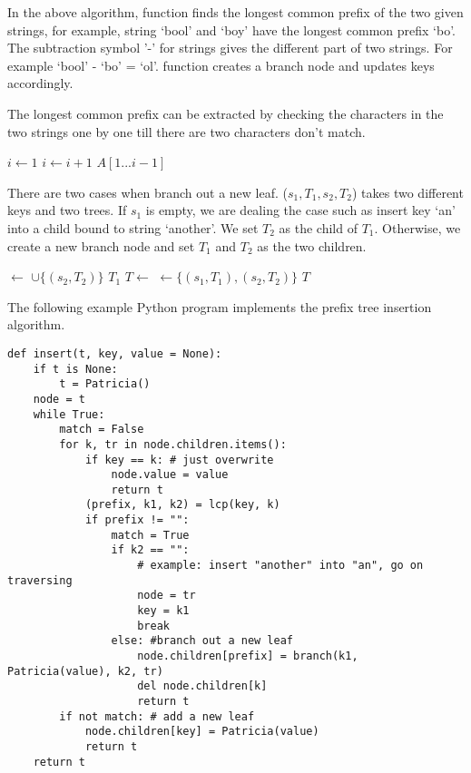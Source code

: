 \documentclass{article}
\begin{document}
In the above algorithm,  function finds the longest
common prefix of the two given strings, for example, string `bool' and `boy'
have the longest common prefix `bo'. The subtraction symbol '-' for
strings gives the different part of two strings. For example `bool' - `bo' = `ol'.  function creates a branch node
and updates keys accordingly.

The longest common prefix can be extracted by checking the characters in the two
strings one by one till there are two characters don't match.

\begin{algorithmic}[1]
  \State $i \gets 1 $
    \State $i \gets i + 1$
  \EndWhile
  \State \Return $A[1...i-1]$
\EndFunction
\end{algorithmic}

There are two cases when branch out a new leaf. ($s_1, T_1, s_2, T_2$)
takes two different keys and two trees. If $s_1$ is empty, we are
dealing the case such as insert key `an' into a child bound to
string `another'. We set $T_2$ as the child of $T_1$. Otherwise,
we create a new branch node and set $T_1$ and $T_2$ as the two children.

\begin{algorithmic}[1]
    \State {} $\gets$  $\cup \{(s_2, T_2)\}$
    \State \Return $T_1$
  \EndIf
  \State $T \gets$ 
  \State {} $\gets \{(s_1, T_1), (s_2, T_2)\}$
  \State \Return $T$
\EndFunction
\end{algorithmic}

The following example Python program implements the prefix tree insertion algorithm.

\lstset{language=Python}
\begin{lstlisting}
def insert(t, key, value = None):
    if t is None:
        t = Patricia()
    node = t
    while True:
        match = False
        for k, tr in node.children.items():
            if key == k: # just overwrite
                node.value = value
                return t
            (prefix, k1, k2) = lcp(key, k)
            if prefix != "":
                match = True
                if k2 == "":
                    # example: insert "another" into "an", go on traversing
                    node = tr
                    key = k1
                    break
                else: #branch out a new leaf
                    node.children[prefix] = branch(k1, Patricia(value), k2, tr)
                    del node.children[k]
                    return t
        if not match: # add a new leaf
            node.children[key] = Patricia(value)
            return t
    return t
\end{lstlisting}
\end{document}
